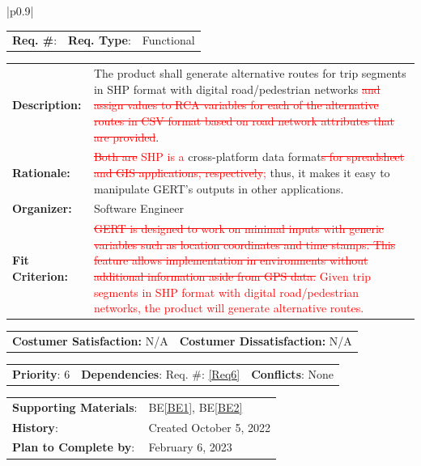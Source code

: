 \documentclass[12pt, titlepage]{article}
\newcommand{\beref}[1]{BE\ref{#1}}
\newcounter{reqnum}
\newcommand{\reqthereqnum}{\textbf{Req. \#}: \thereqnum}
\newcommand{\reqref}[1]{Req. \#: \ref{#1}}
\newenvironment{boxed}
    {\begin{center}
    \begin{tabular}{|p{0.9\textwidth}|}
    \hline\\
    }
    { 
    \\\\\hline
    \end{tabular} 
    \end{center}
    }
\begin{document}
\begin{boxed}
\begin{tabular}{l r r}
{reqnum} \reqthereqnum \label{Req8} & {\bf Req. Type}: &  Functional\\
\end{tabular}
\newline
\begin{tabular}{l p{11.5cm}}
    {\bf Description:} & The product shall generate alternative routes for trip segments in SHP format with digital road/pedestrian networks \textcolor{red}{\sout{and assign values to RCA variables for each of the alternative routes in CSV format based on road network attributes that are provided}}.  \\
    {\bf Rationale:} & \textcolor{red}{\sout{Both are} SHP is a} cross-platform data format\textcolor{red}{\sout{s for spreadsheet and GIS applications, respectively};} thus, it makes it easy to manipulate GERT’s outputs in other applications. \\
    {\bf Organizer:} & Software Engineer\\
    {\bf Fit Criterion:} &  \textcolor{red}{\sout{GERT is designed to work on minimal inputs with generic variables such as location coordinates and time stamps. This feature allows implementation in environments without additional information aside from GPS data.} Given trip segments in SHP format with digital road/pedestrian networks, the product will generate alternative routes.}\\
\end{tabular}
\begin{tabular}{l r}
{\bf Costumer Satisfaction:} N/A &  {\bf Costumer Dissatisfaction:}  N/A\\
\end{tabular}
\begin{tabular}{l r r}
    {\bf Priority}: 6 & {\bf Dependencies}:  \reqref{Req6} & {\bf Conflicts}: None \\
\end{tabular}
\begin{tabular}{l l}
     {\bf Supporting Materials}:& 
     \beref{BE1}, \beref{BE2} \\ 
     {\bf History}: & Created October 5, 2022\\
     {\bf Plan to Complete by}: & February 6, 2023\\
\end{tabular}
\end{boxed}
\end{document}

